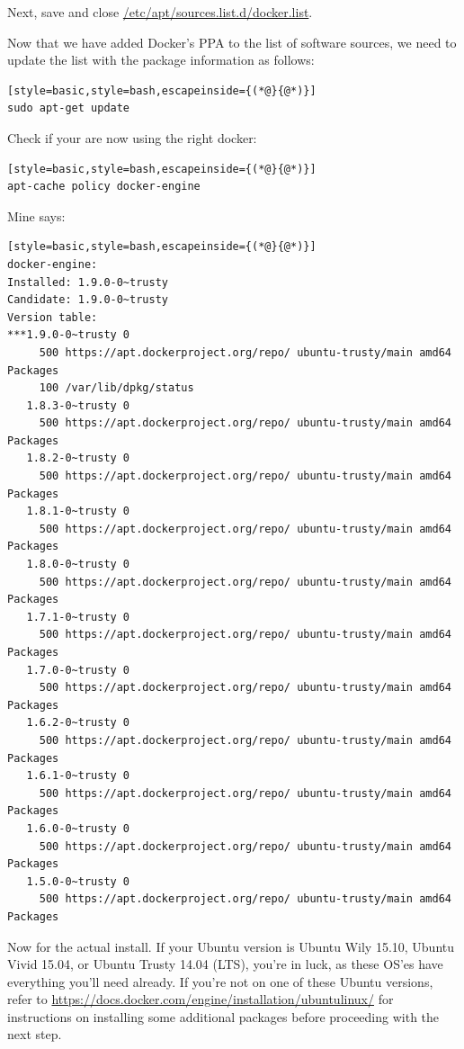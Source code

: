 \documentclass[12pt, a4paper, twoside, openany, titlepage]{book}
\begin{document}
Next, save and close \url{/etc/apt/sources.list.d/docker.list}.

Now that we have added Docker's PPA to the list of software sources, we need to update the list with the package information as follows:
\begin{lstlisting}[style=basic,style=bash,escapeinside={(*@}{@*)}]
sudo apt-get update
\end{lstlisting}

Check if your are now using the right docker:
\begin{lstlisting}[style=basic,style=bash,escapeinside={(*@}{@*)}]
apt-cache policy docker-engine
\end{lstlisting}
Mine says:
\begin{lstlisting}[style=basic,style=bash,escapeinside={(*@}{@*)}]
docker-engine:
Installed: 1.9.0-0~trusty
Candidate: 1.9.0-0~trusty
Version table:
***1.9.0-0~trusty 0
     500 https://apt.dockerproject.org/repo/ ubuntu-trusty/main amd64 Packages
     100 /var/lib/dpkg/status
   1.8.3-0~trusty 0
     500 https://apt.dockerproject.org/repo/ ubuntu-trusty/main amd64 Packages
   1.8.2-0~trusty 0
     500 https://apt.dockerproject.org/repo/ ubuntu-trusty/main amd64 Packages
   1.8.1-0~trusty 0
     500 https://apt.dockerproject.org/repo/ ubuntu-trusty/main amd64 Packages
   1.8.0-0~trusty 0
     500 https://apt.dockerproject.org/repo/ ubuntu-trusty/main amd64 Packages
   1.7.1-0~trusty 0
     500 https://apt.dockerproject.org/repo/ ubuntu-trusty/main amd64 Packages
   1.7.0-0~trusty 0
     500 https://apt.dockerproject.org/repo/ ubuntu-trusty/main amd64 Packages
   1.6.2-0~trusty 0
     500 https://apt.dockerproject.org/repo/ ubuntu-trusty/main amd64 Packages
   1.6.1-0~trusty 0
     500 https://apt.dockerproject.org/repo/ ubuntu-trusty/main amd64 Packages
   1.6.0-0~trusty 0
     500 https://apt.dockerproject.org/repo/ ubuntu-trusty/main amd64 Packages
   1.5.0-0~trusty 0
     500 https://apt.dockerproject.org/repo/ ubuntu-trusty/main amd64 Packages
\end{lstlisting}

Now for the actual install. If your Ubuntu version is Ubuntu Wily 15.10, Ubuntu Vivid 15.04, or Ubuntu Trusty 14.04 (LTS), you're in luck, as these OS'es have everything you'll need already. If you're not on one of these Ubuntu versions, refer to \url{https://docs.docker.com/engine/installation/ubuntulinux/} for instructions on installing some additional packages before proceeding with the next step.
\end{document}
